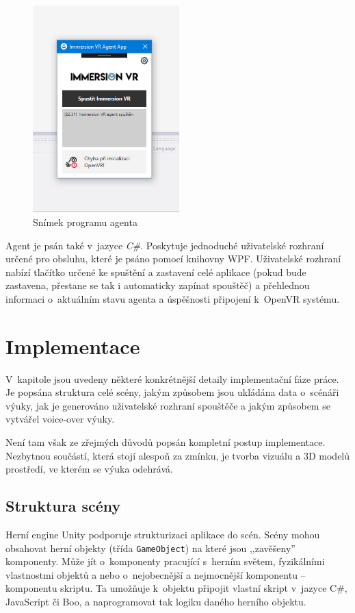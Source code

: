 \begin{figure}[h!]
\centering
\includegraphics[height=8cm]{src/assets/agent-screen.png}
\caption{Snímek programu agenta}
\end{figure}

Agent je psán také v~jazyce \emph{C\#}. Poskytuje jednoduché uživatelské
rozhraní určené pro obsluhu, které je psáno pomocí knihovny WPF.
Uživatelské rozhraní nabízí tlačítko určené ke spuštění a zastavení celé
aplikace (pokud bude zastavena, přestane se tak i automaticky zapínat
spouštěč) a přehlednou informaci o~aktuálním stavu agenta a úspěšnosti
připojení k~OpenVR systému.

\section{Implementace}\label{implementace}

V~kapitole jsou uvedeny některé konkrétnější detaily implementační fáze
práce. Je popsána struktura celé scény, jakým způsobem jsou ukládána
data o~scénáři výuky, jak je generováno uživatelské rozhraní spouštěče a
jakým způsobem se vytvářel voice-over výuky.

Není tam však ze zřejmých důvodů popsán kompletní postup
implementace. Nezbytnou součástí, která stojí alespoň za zmínku, je
tvorba vizuálu a 3D modelů prostředí, ve kterém se výuka odehrává.

\subsection{Struktura scény}\label{struktura-scuxe9ny}

Herní engine Unity podporuje strukturizaci aplikace do scén. Scény mohou
obsahovat herní objekty (třída \texttt{GameObject}) na které jsou
,,zavěšeny'' komponenty. \autocite{unityscenes} Může jít o~komponenty pracující s~herním
světem, fyzikálními vlastnostmi objektů a nebo o~nejobecnější a
nejmocnější komponentu -- komponentu skriptu. Ta umožňuje k~objektu
připojit vlastní skript v~jazyce C\#, JavaScript či Boo, a naprogramovat
tak logiku daného herního objektu.

